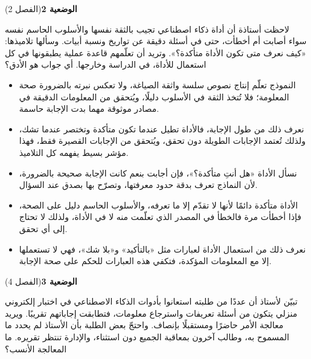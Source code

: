 \documentclass[11pt,a4paper]{article}
\begin{document}
\par\vspace{6pt}
\noindent
{\large\khatt\textbf{الوضعية 2}}\hfill{\small(الفصل 2)}\par\nopagebreak\vspace{3pt}
\setlength{\fboxsep}{7pt}\colorbox{gray!10}{\parbox{\dimexpr\linewidth-14pt}{لاحظت أستاذة أن أداة ذكاء اصطناعي تجيب بالثقة نفسها والأسلوب الحاسم نفسه سواء أصابت أم أخطأت، حتى في أسئلة دقيقة عن تواريخ ونسبة أبيات. وسألها تلاميذها: «كيف نعرف متى تكون الأداة متأكدة؟». وتريد أن تعلّمهم قاعدة عملية يطبقونها في كل استعمال للأداة، في الدراسة وخارجها. أي جواب هو الأدق؟}}\par\nopagebreak
\begin{itemize}[leftmargin=1.0cm, labelsep=6pt, itemsep=3pt, topsep=4pt, parsep=0pt]
  \item[\textbf{أ)}] النموذج تعلّم إنتاج نصوص سلسة واثقة الصياغة، ولا تعكس نبرته بالضرورة صحة المعلومة؛ فلا تُتخذ الثقة في الأسلوب دليلًا، ويُتحقق من المعلومات الدقيقة في مصادر موثوقة مهما بدت الإجابة حاسمة.
  \item[\textbf{ب)}] نعرف ذلك من طول الإجابة، فالأداة تطيل عندما تكون متأكدة وتختصر عندما تشك، ولذلك تُعتمد الإجابات الطويلة دون تحقق، ويُتحقق من الإجابات القصيرة فقط، فهذا مؤشر بسيط يفهمه كل التلاميذ.
  \item[\textbf{ج)}] نسأل الأداة «هل أنتِ متأكدة؟»، فإن أجابت بنعم كانت الإجابة صحيحة بالضرورة، لأن النماذج تعرف بدقة حدود معرفتها، وتصرّح بها بصدق عند السؤال.
  \item[\textbf{د)}] الأداة متأكدة دائمًا لأنها لا تقدّم إلا ما تعرفه، والأسلوب الحاسم دليل على الصحة، فإذا أخطأت مرة فالخطأ في المصدر الذي تعلّمت منه لا في الأداة، ولذلك لا تحتاج إلى أي تحقق.
  \item[\textbf{هـ)}] نعرف ذلك من استعمال الأداة لعبارات مثل «بالتأكيد» و«بلا شك»، فهي لا تستعملها إلا مع المعلومات المؤكدة، فتكفي هذه العبارات للحكم على صحة الإجابة.
\end{itemize}
\par\vspace{6pt}
\noindent
{\large\khatt\textbf{الوضعية 3}}\hfill{\small(الفصل 4)}\par\nopagebreak\vspace{3pt}
\setlength{\fboxsep}{7pt}\colorbox{gray!10}{\parbox{\dimexpr\linewidth-14pt}{تبيّن لأستاذ أن عددًا من طلبته استعانوا بأدوات الذكاء الاصطناعي في اختبار إلكتروني منزلي يتكون من أسئلة تعريفات واسترجاع معلومات، فتطابقت إجاباتهم تقريبًا. ويريد معالجة الأمر حاضرًا ومستقبلًا بإنصاف. واحتجّ بعض الطلبة بأن الأستاذ لم يحدد ما المسموح به، وطالب آخرون بمعاقبة الجميع دون استثناء، والإدارة تنتظر تقريره. ما المعالجة الأنسب؟}}\par\nopagebreak
\end{document}
